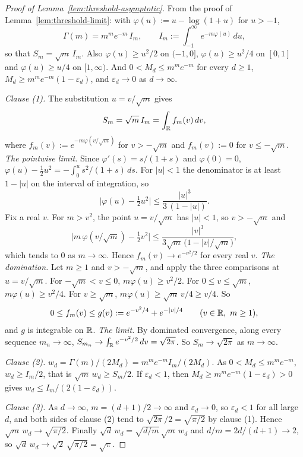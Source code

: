 \begin{proof}[Proof of Lemma~\ref{lem:threshold-asymptotic}]
From the proof of Lemma~\ref{lem:threshold-limit}: with $\varphi(u) := u - \log(1+u)$ for $u > -1$,
\[
  \Gamma(m) = m^m e^{-m}\,I_m , \qquad I_m := \int_{-1}^\infty e^{-m\varphi(u)}\,du ,
\]
so that $S_m = \sqrt m\,I_m$. Also $\varphi(u) \ge u^2/2$ on $(-1,0]$, $\varphi(u) \ge u^2/4$ on
$[0,1]$ and $\varphi(u) \ge u/4$ on $[1,\infty)$. And $0 < M_d \le m^m e^{-m}$ for every
$d \ge 1$, $M_d \ge m^m e^{-m}(1 - \varepsilon_d)$, and $\varepsilon_d \to 0$ as $d \to \infty$.

\emph{Clause (1).} The substitution $u = v/\sqrt m$ gives
\[
  S_m = \sqrt m\,I_m = \int_{\mathbb{R}} f_m(v)\,dv ,
\]
where $f_m(v) := e^{-m\varphi(v/\sqrt m)}$ for $v > -\sqrt m$ and $f_m(v) := 0$ for
$v \le -\sqrt m$.
\emph{The pointwise limit.} Since $\varphi'(s) = s/(1+s)$ and $\varphi(0) = 0$,
$\varphi(u) - \tfrac12 u^2 = -\int_0^u s^2/(1+s)\,ds$. For $|u| < 1$ the denominator is at least
$1 - |u|$ on the interval of integration, so
\[
  \bigl|\varphi(u) - \tfrac12 u^2\bigr| \le \frac{|u|^3}{3\,(1 - |u|)} .
\]
Fix a real $v$. For $m > v^2$, the point $u = v/\sqrt m$ has $|u| < 1$, so $v > -\sqrt m$ and
\[
  \bigl|m\,\varphi(v/\sqrt m) - \tfrac12 v^2\bigr|
   \le \frac{|v|^3}{3\sqrt m\,\bigl(1 - |v|/\sqrt m\bigr)} ,
\]
which tends to $0$ as $m \to \infty$. Hence $f_m(v) \to e^{-v^2/2}$ for every real $v$.
\emph{The domination.} Let $m \ge 1$ and $v > -\sqrt m$, and apply the three comparisons at
$u = v/\sqrt m$. For $-\sqrt m < v \le 0$, $m\varphi(u) \ge v^2/2$. For $0 \le v \le \sqrt m$,
$m\varphi(u) \ge v^2/4$. For $v \ge \sqrt m$, $m\varphi(u) \ge \sqrt m\,v/4 \ge v/4$. So
\[
  0 \le f_m(v) \le g(v) := e^{-v^2/4} + e^{-|v|/4} \qquad (v \in \mathbb{R},\ m \ge 1),
\]
and $g$ is integrable on $\mathbb{R}$. \emph{The limit.} By dominated convergence, along every sequence
$m_n \to \infty$, $S_{m_n} \to \int_{\mathbb{R}}e^{-v^2/2}\,dv = \sqrt{2\pi}$. So $S_m \to \sqrt{2\pi}$ as
$m \to \infty$.

\emph{Clause (2).} $w_d = \Gamma(m)/(2M_d) = m^m e^{-m}I_m/(2M_d)$. As $0 < M_d \le m^m e^{-m}$,
$w_d \ge I_m/2$, that is $\sqrt m\,w_d \ge S_m/2$. If $\varepsilon_d < 1$, then
$M_d \ge m^m e^{-m}(1 - \varepsilon_d) > 0$ gives $w_d \le I_m/(2(1 - \varepsilon_d))$.

\emph{Clause (3).} As $d \to \infty$, $m = (d+1)/2 \to \infty$ and $\varepsilon_d \to 0$, so
$\varepsilon_d < 1$ for all large $d$, and both sides of clause (2) tend to $\sqrt{2\pi}/2 =
\sqrt{\pi/2}$ by clause (1). Hence $\sqrt m\,w_d \to \sqrt{\pi/2}$. Finally
$\sqrt d\,w_d = \sqrt{d/m}\,\sqrt m\,w_d$ and $d/m = 2d/(d+1) \to 2$, so
$\sqrt d\,w_d \to \sqrt2\,\sqrt{\pi/2} = \sqrt\pi$.
\end{proof}

